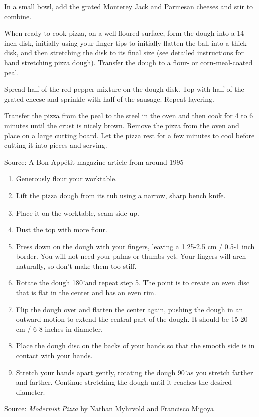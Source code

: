 \documentclass[letterpaper]{recipePMG}
\renewcommand{\deg}{$^\circ$}
\begin{document}
In a small bowl, add the grated Monterey Jack and Parmesan cheeses and stir to combine.

When ready to cook pizza, on a well-floured surface, form the dough into a 14 inch disk, initially using your finger tips to initially flatten the ball into a thick disk, and then stretching the disk to its final size (see detailed instructions for \hyperref[HandStretchPizzaDough]{hand stretching pizza dough}). Transfer the dough to a flour- or corn-meal-coated peal. 

Spread half  of the red pepper mixture on the dough disk. Top with half of the grated cheese and sprinkle with half of the sausage. Repeat layering.

 Transfer the pizza from the peal to the steel in the oven and then cook for 4 to 6 minutes until the crust is nicely brown.  Remove the pizza from the oven and place on a large cutting board. Let the pizza rest for a few minutes to cool before cutting it into pieces and serving.

 Source: A Bon App\'{e}tit magazine article from around 1995

\newpage
{}
\label{HandStretchPizzaDough}
\begin{enumerate}
   
\item Generously flour your worktable.

\item Lift the pizza dough from its tub using a narrow, sharp bench knife.

\item Place it on the worktable, seam side up.

\item Dust the top with more flour.

\item Press down on the dough with your fingers, leaving a 1.25-2.5 cm / 0.5-1 inch border. You will not need your palms or thumbs yet. Your fingers will arch naturally, so don't make them too stiff.

\item Rotate the dough 180\deg and repeat step 5. The point is to create an even disc that is flat in the center and has an even rim.

\item Flip the dough over and flatten the center again, pushing the dough in an outward motion to extend the central part of the dough. It should be 15-20 cm / 6-8 inches in diameter.

\item Place the dough disc on the backs of your hands so that the smooth side is in contact with your hands.

\item Stretch your hands apart gently, rotating the dough 90\deg as you stretch farther and farther. Continue stretching the dough until it reaches the desired diameter.
\end{enumerate}
Source: \textit{Modernist Pizza} by Nathan Myhrvold and Francisco Migoya
\end{document}
